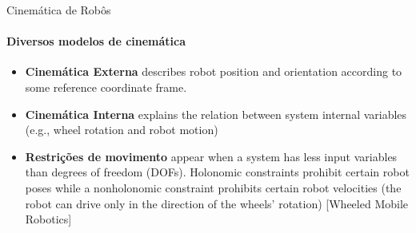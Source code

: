 \documentclass{beamer}
\begin{document}
\begin{frame}{Cinemática de Robôs}
    \framesubtitle{Diversos modelos de cinemática}
    \begin{itemize}
        \item \textbf{Cinemática Externa} describes robot position and orientation according to
some reference coordinate frame.
        \item \textbf{Cinemática Interna} explains the relation between system internal variables
(e.g., wheel rotation and robot motion)
        \item \textbf{Restrições de movimento} appear when a system has less input variables than
degrees of freedom (DOFs). Holonomic constraints prohibit certain
robot poses while a nonholonomic constraint prohibits certain robot
velocities (the robot can drive only in the direction of the wheels’
rotation) [Wheeled Mobile Robotics]
    \end{itemize}
\end{frame}
\end{document}
